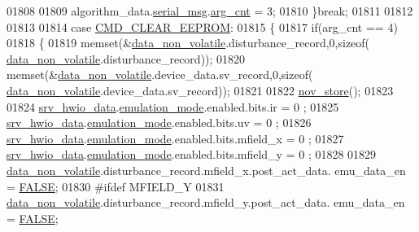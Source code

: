 \begin{DoxyCode}
{{{{{01808 
01809                              algorithm\_data.\hyperlink{a00016_afcf5f557aea688aad985eec15269c1da}{serial\_msg}.\hyperlink{a00031_a7b79f40e2eeec288091afd340bf8f591}{arg\_cnt} = 3;
01810                 \}\textcolor{keywordflow}{break};
01811 
01812                
01813 
01814                  \textcolor{keywordflow}{case}  \hyperlink{a00021_a9084e0a84e73318b6fad9841fb4d4f98}{CMD\_CLEAR\_EEPROM}:
01815                 \{
01817                       \textcolor{keywordflow}{if}(arg\_cnt == 4)
01818                      \{
01819                      memset(&\hyperlink{a00060_a76ac5f917f5308dcd83de0d7c94559fb}{data\_non\_volatile}.disturbance\_record,0,\textcolor{keyword}{sizeof}(
      \hyperlink{a00060_a76ac5f917f5308dcd83de0d7c94559fb}{data\_non\_volatile}.disturbance\_record));
01820                              memset(&\hyperlink{a00060_a76ac5f917f5308dcd83de0d7c94559fb}{data\_non\_volatile}.device\_data.sv\_record,0,\textcolor{keyword}{sizeof}(
      \hyperlink{a00060_a76ac5f917f5308dcd83de0d7c94559fb}{data\_non\_volatile}.device\_data.sv\_record));
01821                         
01822                              \hyperlink{a00029_a90aef186f45a15d94bf0247122194991}{nov\_store}();
01823 
01824                           \hyperlink{a00034_a0fd91014631926f362c7c2b2f5d143b0}{srv\_hwio\_data}.\hyperlink{a00034_a742dceaef1f19ec73ed5acc066127476}{emulation\_mode}.enabled.bits.ir       = 0
      ;
01825                           \hyperlink{a00034_a0fd91014631926f362c7c2b2f5d143b0}{srv\_hwio\_data}.\hyperlink{a00034_a742dceaef1f19ec73ed5acc066127476}{emulation\_mode}.enabled.bits.uv       = 0
      ;
01826                           \hyperlink{a00034_a0fd91014631926f362c7c2b2f5d143b0}{srv\_hwio\_data}.\hyperlink{a00034_a742dceaef1f19ec73ed5acc066127476}{emulation\_mode}.enabled.bits.mfield\_x = 0
      ;
01827                           \hyperlink{a00034_a0fd91014631926f362c7c2b2f5d143b0}{srv\_hwio\_data}.\hyperlink{a00034_a742dceaef1f19ec73ed5acc066127476}{emulation\_mode}.enabled.bits.mfield\_y = 0
      ;
01828 
01829                           \hyperlink{a00060_a76ac5f917f5308dcd83de0d7c94559fb}{data\_non\_volatile}.disturbance\_record.mfield\_x.post\_act\_data.
      emu\_data\_en = \hyperlink{a00040_aa93f0eb578d23995850d61f7d61c55c1}{FALSE};
01830 \textcolor{preprocessor}{                          #ifdef MFIELD\_Y}
01831                           \hyperlink{a00060_a76ac5f917f5308dcd83de0d7c94559fb}{data\_non\_volatile}.disturbance\_record.mfield\_y.post\_act\_data.
      emu\_data\_en = \hyperlink{a00040_aa93f0eb578d23995850d61f7d61c55c1}{FALSE};
}}}}}
\end{DoxyCode}
